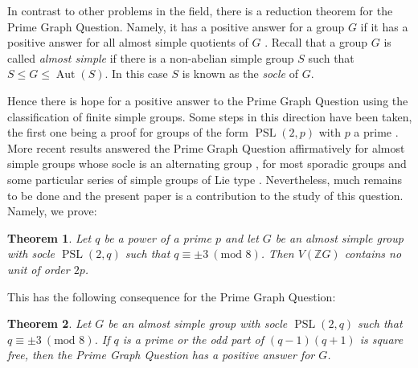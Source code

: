 \documentclass[11pt, a4paper]{amsart}
\newtheorem{theorem}{Theorem}[section]
\theoremstyle{definition}
\theoremstyle{definition}
\newcommand{\ChLeo}[1]{\textcolor{red}{#1}}
\newcommand{\Aut}{\operatorname{Aut}}
\newcommand{\PSL}{{\operatorname{PSL}}}
\renewcommand{\leq}{\leqslant}
\begin{document}
In contrast to other problems in the field, there is a reduction theorem for the Prime Graph Question. Namely, it has a positive answer for a group $G$ if it has a positive answer for all almost simple quotients of $G$ \cite[Theorem 2.1]{KimmerleKonovalov}. Recall that a group $G$ is called \textit{almost simple} if there is a non-abelian simple group $S$ such that $S \leq G \leq \Aut(S)$. In this case $S$ is known as the \textit{socle} of $G$. 

Hence there is hope for a positive answer to the Prime Graph Question using the classification of finite simple groups. Some steps in this direction have been taken, the first one being a proof for groups of the form $\PSL(2,p)$ with $p$ a prime \cite{LutharPassi, HertweckBrauer}. More recent results answered the Prime Graph Question affirmatively for almost simple groups whose socle is an alternating group \cite{BaechleMargolisAn}, for most sporadic groups and some particular series of simple groups of Lie type \cite{CaicedoMargolis}. Nevertheless, much remains to be done and the present paper is a contribution to the study of this question. Namely, we prove:

\begin{theorem}\label{th:Order2p}
Let $q$ be a power of a prime $p$ and let $G$ be an almost simple group with socle $\PSL(2,q)$ such that $q\equiv \pm 3 \ (\textrm{mod } 8)$. Then $V(\mathbb{Z}G)$ contains no unit of order $2p$.  
\end{theorem}

This has the following consequence for the Prime Graph Question:


\begin{theorem}\label{th:ApplicationPQ}
Let $G$ be an almost simple group with socle $\PSL(2,q)$ such that $q\equiv \pm 3 \ (\textrm{mod } 8)$. If $q$ is a prime or the odd part of $(q-1)(q+1)$ is square free, then the Prime Graph Question has a positive answer for $G$.
\end{theorem}
\end{document}
